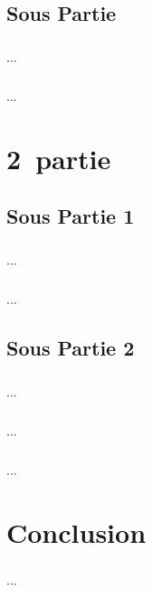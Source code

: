\documentclass[a4paper,french,10pt]{memoir}
\begin{document}
\section{Sous Partie }
\paragraph{}
...
\paragraph{}
...
 
 
\chapter{2\ieme ~partie}
\section{Sous Partie 1}
\paragraph{}
...
\paragraph{}
...
\section{Sous Partie 2}
\paragraph{}
...
\paragraph{}

\paragraph{}
...
\paragraph{}
...
 
 
\backmatter %
\chapter{Conclusion}
\paragraph{}
 ...
\listoffigures %
\appendix %
\end{document}
